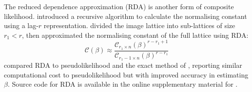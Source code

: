\documentclass[nojss,shortnames]{jss}\usepackage[]{graphicx}\usepackage[]{color}
\begin{document}
The reduced dependence approximation (RDA) is another form of composite likelihood. \citet{Reeves2004} introduced a recursive algorithm to calculate the normalising constant using a lag-$r$ representation. \citet{Friel2009} divided the image lattice into sub-lattices of size $r_1 < r$, then approximated the normalising constant of the full lattice using RDA:
\begin{equation}
\mathcal{C}(\beta) \approx \frac{\mathcal{C}_{r_1 \times n}(\beta)^{r - r_1 + 1}}{\mathcal{C}_{r_1 - 1 \times n}(\beta)^{r - r_1}}
\label{eq:rda}
\end{equation}
\citet{McGrory2009} compared RDA to pseudolikelihood and the exact method of \citet{Moeller2006}, reporting similar computational cost to pseudolikelihood but with improved accuracy in estimating $\beta$. Source code for RDA is available in the online supplementary material for \citet{McGrory2012}.
\end{document}
